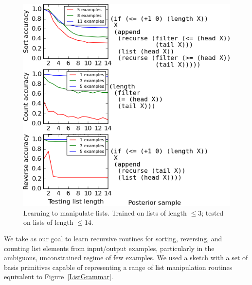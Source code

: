 \documentclass{article}
\begin{document}
\begin{figure}\centering
  \vspace{-0.15cm}
  \begin{minipage}{0.5\textwidth}
  \label{ListGrammar}
  \end{minipage}
  
\vspace{\baselineskip}

\begin{minipage}{0.5\textwidth}
    \includegraphics[width=\textwidth]{tinyList.png}
  \caption{Learning to manipulate lists. Trained on lists of length $\leq 3$; tested on lists of length $\leq 14$.}
  \label{listCurves}
\end{minipage}
\vspace{-0.7cm}
\end{figure}
We take as our goal to learn recursive routines for sorting, reversing, and counting list elements from input/output examples,
particularly in the ambiguous,
unconstrained regime of few examples.
We used a sketch  with a set of basis primitives capable of representing a range of list manipulation routines equivalent to Figure~\ref{ListGrammar}.
\end{document}
